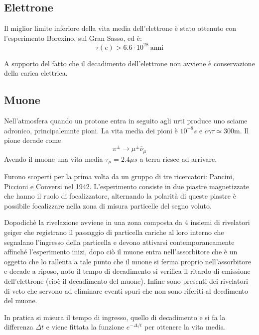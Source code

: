 \documentclass[12pt]{book}
\begin{document}
\subsection{Elettrone}
Il miglior limite inferiore della vita media dell'elettrone è stato ottenuto con l'esperimento Borexino, sul Gran Sasso, ed è:
\begin{equation}
	\tau (e) > 6.6 \cdot 10^{28} \ \text{anni}
\end{equation}

A supporto del fatto che il decadimento dell'elettrone non avviene è conservazione della carica elettrica. 

\subsection{Muone}
Nell'atmosfera quando un protone entra in seguito agli urti produce uno sciame adronico, principalemnte pioni. La vita media dei pioni è $10^{-8}s$ e $c \gamma \tau \simeq 300$m. Il pione decade come
\begin{equation}
	\pi^\pm \rightarrow \mu^\pm \overline \nu _\mu
\end{equation}
Avendo il muone una vita media $\tau_\mu =2.4 \mu s$ a terra riesce ad arrivare.


Furono scoperti per la prima volta da un gruppo di tre ricercatori: Pancini, Piccioni e Conversi nel 1942.  L'esperimento consiste in due piastre magnetizzate che hanno il ruolo di focalizzatore, alternando la polarità di queste piastre è possibile focalizzare nella zona di misura particelle del segno voluto. 

Dopodichè la rivelazione avviene in una zona composta da 4 insiemi di rivelatori geiger che registrano il passaggio di particella cariche al loro interno che segnalano l'ingresso della particella e devono attivarsi contemporaneamente affinché l'esperimento inizi, dopo ciò il muone entra nell'assorbitore che è un oggetto che lo rallenta a tale punto che il muone si ferma proprio nell'assorbitore e decade a riposo, noto il tempo di decadimento si verifica il ritardo di emissione dell'elettrone (cioè il decadimento del muone). Infine sono presenti dei rivelatori di veto che servono ad eliminare eventi spuri che non sono riferiti al decdimento del muone.

In pratica si misura il tempo di ingresso, quello di decadimento e si fa la differenza $\Delta t$ e viene fittata la funzione $e^{-\Delta /t}$ per ottenere la vita media.
\end{document}
